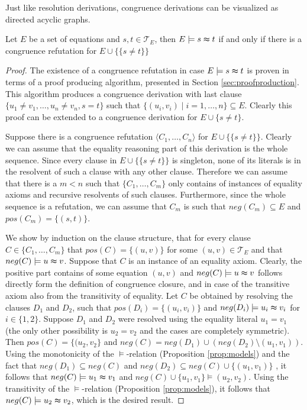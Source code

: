 Just like resolution derivations, congruence derivations can be visualized as directed acyclic graphs.

\begin{proposition}

Let $E$ be a set of equations and $s,t \in \mathcal{T}_E$, then $E \models s \thickapprox t$ if and only if there is a congruence refutation for $E \cup \{\{ s \neq t\}\}$

\end{proposition}

\begin{proof}

The existence of a congruence refutation in case $E \models s \thickapprox t$ is proven in terms of a proof producing algorithm, presented in Section \ref{sec:proofproduction}.
This algorithm produces a congruence derivation with last clause $\{u_1 \neq v_1,\ldots,u_n \neq v_n, s = t\}$ such that $\{(u_i,v_i) \mid i = 1,\ldots,n\} \subseteq E$.
Clearly this proof can be extended to a congruence derivation for $E \cup \{ s \neq t\}$.

Suppose there is a congruence refutation $\langle C_1, \ldots, C_n \rangle$ for $E \cup \{\{ s \neq t\}\}$.
Clearly we can assume that the equality reasoning part of this derivation is the whole sequence.
Since every clause in $E \cup \{\{ s \neq t\}\}$ is singleton, none of its literals is in the resolvent of such a clause with any other clause.
Therefore we can assume that there is a $m < n$ such that $\{C_1, \ldots, C_m\}$ only contains of instances of equality axioms and recursive resolvents of such clauses.
Furthermore, since the whole sequence is a refutation, we can assume that $C_m$ is such that $neg(C_m) \subseteq E$ and $pos(C_m) = \{(s,t)\}$.

We show by induction on the clause structure, that for every clause $C \in \{C_1,\ldots,C_m\}$ that $pos(C) = \{(u,v)\}$ for some $(u,v) \in \mathcal{T}_E$ and that $neg(C) \models u \thickapprox v$.
Suppose that $C$ is an instance of an equality axiom. Clearly, the positive part contains of some equation $(u,v)$ and $neg(C) \models u \thickapprox v$ follows directly form the definition of congruence closure, and in case of the transitive axiom also from the transitivity of equality.
Let $C$ be obtained by resolving the clauses $D_1$ and $D_2$, such that $pos(D_i) = \{(u_i,v_i)\}$ and $neg(D_i) \models u_i \thickapprox v_i$ for $i \in \{1,2\}$.
Suppose $D_1$ and $D_2$ were resolved using the equality literal $u_1 = v_1$ (the only other possibility is $u_2 = v_2$ and the cases are completely symmetric).
Then $pos(C) = \{(u_2,v_2\}$ and $neg(C) = neg(D_1) \cup (neg(D_2) \setminus (u_1,v_1))$.
Using the monotonicity of the $\models$-relation (Proposition \ref{prop:models}) and the fact that $neg(D_1) \subseteq neg(C)$ and $neg(D_2) \subseteq neg(C) \cup \{(u_1,v_1)\}$ , it follows that $neg(C) \models u_1 \thickapprox v_1$ and $neg(C) \cup \{u_1,v_1\} \models (u_2,v_2)$.
Using the transitivity of the $\models$-relation (Proposition \ref{prop:models}), it follows that $neg(C) \models u_2 \thickapprox v_2$, which is the desired result.

\end{proof}